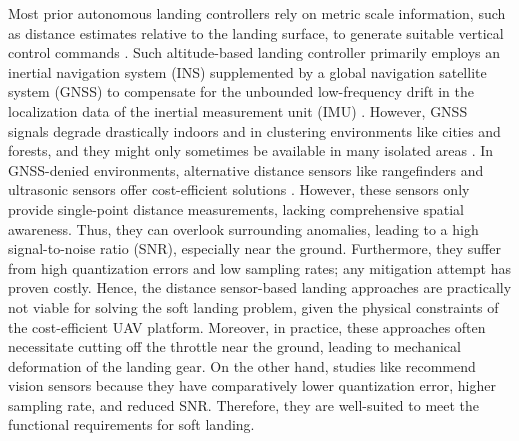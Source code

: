\documentclass{IEEEtaes}
\begin{document}
Most prior autonomous landing controllers rely on metric scale information, such as distance estimates relative to the landing surface, to generate suitable vertical control commands \cite{gautam2014}.
Such altitude-based landing controller primarily employs an inertial navigation system (INS) supplemented by a global navigation satellite system (GNSS) to compensate for the unbounded low-frequency drift in the localization data of the inertial measurement unit (IMU) \cite{bruggemann2011}.
However, GNSS signals degrade drastically indoors and in clustering environments like cities and forests, and they might only sometimes be available in many isolated areas \cite{zhang2015}.
In GNSS-denied environments, alternative distance sensors like rangefinders and ultrasonic sensors offer cost-efficient solutions \cite{zhao2012}.
However, these sensors only provide single-point distance measurements, lacking comprehensive spatial awareness.
Thus, they can overlook surrounding anomalies, leading to a high signal-to-noise ratio (SNR), especially near the ground.
Furthermore, they suffer from high quantization errors and low sampling rates; any mitigation attempt has proven costly.
Hence, the distance sensor-based landing approaches are practically not viable for solving the soft landing problem, given the physical constraints of the cost-efficient UAV platform.
Moreover, in practice, these approaches often necessitate cutting off the throttle near the ground, leading to mechanical deformation of the landing gear.
On the other hand, studies like \cite{gautam2014, zhang2015, lin2022} recommend vision sensors because they have comparatively lower quantization error, higher sampling rate, and reduced SNR.
Therefore, they are well-suited to meet the functional requirements for soft landing.
\end{document}
